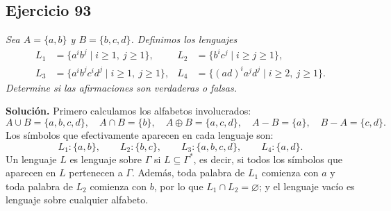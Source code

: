 \subsection*{Ejercicio 93}

\noindent\textit{Sea $A = \{a, b\}$ y $B = \{b, c, d\}$. Definimos los lenguajes}
\[
\begin{aligned}
    L_1 &= \{a^i b^j \mid i \geq 1,\ j \geq 1\}, &
    L_2 &= \{b^i c^j \mid i \geq j \geq 1\}, \\
    L_3 &= \{a^i b^j c^i d^j \mid i \geq 1,\ j \geq 1\}, &
    L_4 &= \{(ad)^i a^j d^j \mid i \geq 2,\ j \geq 1\}.
\end{aligned}
\]
\noindent\textit{Determine si las afirmaciones son verdaderas o falsas.}

\medskip
\noindent\textbf{Solución.} Primero calculamos los alfabetos involucrados:
\[
A \cup B = \{a, b, c, d\}, \quad
A \cap B = \{b\}, \quad
A \oplus B = \{a, c, d\}, \quad
A - B = \{a\}, \quad
B - A = \{c, d\}.
\]
Los símbolos que efectivamente aparecen en cada lenguaje son:
\[
L_1: \{a, b\}, \qquad L_2: \{b, c\}, \qquad L_3: \{a, b, c, d\}, \qquad L_4: \{a, d\}.
\]
Un lenguaje $L$ es lenguaje sobre $\Gamma$ si $L \subseteq \Gamma^*$, es decir, si todos
los símbolos que aparecen en $L$ pertenecen a $\Gamma$. Además, toda palabra de
$L_1$ comienza con $a$ y toda palabra de $L_2$ comienza con $b$, por lo que
$L_1 \cap L_2 = \varnothing$; y el lenguaje vacío es lenguaje sobre cualquier
alfabeto.

